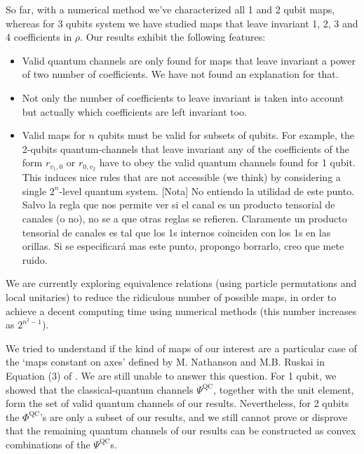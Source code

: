 \documentclass[11pt]{article}
\begin{document}
So far, with a numerical method we've characterized all 1 and 2 qubit maps, whereas 
for 3 qubits system we have studied maps that leave invariant 1, 2, 3 and 4
coefficients in $\rho$. Our results exhibit the following features:
\begin{itemize}
\item Valid quantum channels are only found for maps that leave invariant a
power of two number of coefficients. We have not found an explanation for that.
\item 
Not only the number of coefficients to leave
invariant is taken into account but actually which coefficients are left
invariant too. 
\item Valid maps for $n$ qubits must be valid for subsets of qubits. For example, 
the 2-qubits quantum-channels
that leave invariant any of the coefficients of the form $r_{v_1,0}$ or
$r_{0,v_2}$ have to obey the valid quantum channels found for 1 qubit. 
This induces nice rules that are not accessible (we think) by considering 
a single $2^n$-level quantum system. {\color{red} [Nota]
No entiendo la utilidad de este punto. Salvo la regla que nos permite ver si el canal es un producto tensorial de canales (o no), no se a que otras reglas se refieren. Claramente un producto tensorial de canales es tal que los 1s internos coinciden con los 1s en las orillas. Si se especificará mas este punto, propongo borrarlo, creo que mete ruido.}
\end{itemize}
We are currently exploring equivalence relations (using particle permutations and local unitaries) to reduce the ridiculous
number of possible maps, in order to achieve a decent computing time using numerical methods (this number increases as $2^{n^2-1}$). 

We tried to understand if the kind of maps of our interest are a particular
case of the `maps constant on axes' defined by M.  Nathanson and M.B. Ruskai
in Equation (3) of \cite{nathanson2007pauli}. We are still unable to 
answer this question. 
For 1 qubit, we showed that the classical-quantum
channels $\Psi ^{\text{QC}}$, together with the unit element, form the set of
valid quantum channels of our results. Nevertheless, for 2 qubits the $\Phi
^{\text{QC}}$'s are only a subset of our results, and we still cannot prove or
disprove that the remaining quantum channels of our results can be constructed
as convex combinations of the $\Psi ^{\text{QC}}$s.
\end{document}

